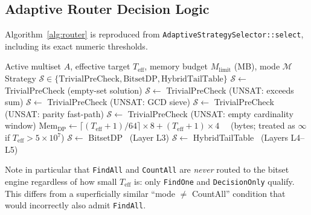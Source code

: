 \documentclass[journal,onecolumn,11pt]{IEEEtran}
\begin{document}
\subsection{Adaptive Router Decision Logic}
Algorithm~\ref{alg:router} is reproduced from \texttt{AdaptiveStrategySelector::select}, including its exact numeric thresholds.

\begin{algorithm}[h]
\caption{Adaptive Structural Router Dispatch (verbatim thresholds)}
\label{alg:router}
\begin{algorithmic}[1]
\REQUIRE Active multiset $A$, effective target $T_{\text{eff}}$, memory budget $M_{\text{limit}}$ (MB), mode $\mathcal{M}$
\ENSURE Strategy $\mathcal{S} \in \{\text{TrivialPreCheck}, \text{BitsetDP}, \text{HybridTailTable}\}$
    \RETURN $\mathcal{S}\leftarrow$ TrivialPreCheck (empty-set solution)
\ENDIF
{}
    \RETURN $\mathcal{S}\leftarrow$ TrivialPreCheck (UNSAT: exceeds sum)
\ENDIF
{}
    \RETURN $\mathcal{S}\leftarrow$ TrivialPreCheck (UNSAT: GCD sieve)
\ENDIF
{}
    \RETURN $\mathcal{S}\leftarrow$ TrivialPreCheck (UNSAT: parity fast-path)
\ENDIF
{}
    \RETURN $\mathcal{S}\leftarrow$ TrivialPreCheck (UNSAT: empty cardinality window)
\ENDIF
\STATE $\text{Mem}_{\text{DP}} \leftarrow \big\lceil (T_{\text{eff}}+1)/64 \big\rceil \times 8 + (T_{\text{eff}}+1)\times 4$ \ \ (bytes; treated as $\infty$ if $T_{\text{eff}} > 5\times10^7$)
    \RETURN $\mathcal{S}\leftarrow$ BitsetDP \ (Layer L3)
\ELSE
    \RETURN $\mathcal{S}\leftarrow$ HybridTailTable \ (Layers L4--L5)
\ENDIF
\end{algorithmic}
\end{algorithm}

Note in particular that \texttt{FindAll} and \texttt{CountAll} are \emph{never} routed to the bitset engine regardless of how small $T_{\text{eff}}$ is: only \texttt{FindOne} and \texttt{DecisionOnly} qualify. This differs from a superficially similar ``mode $\ne$ CountAll'' condition that would incorrectly also admit \texttt{FindAll}.
\end{document}
